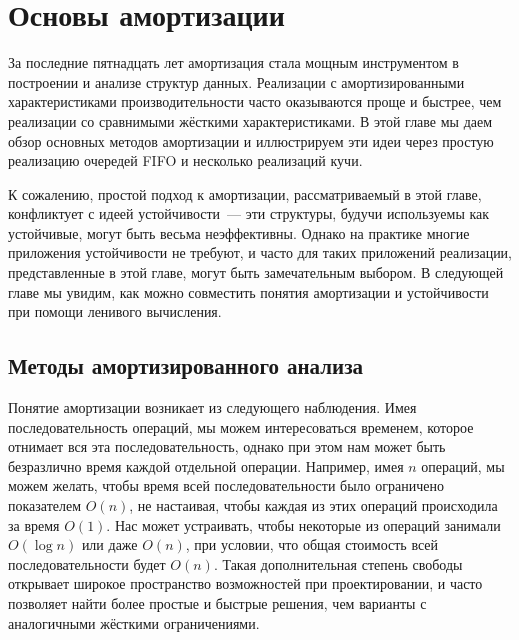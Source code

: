 \chapter{Основы амортизации}
\label{ch:5}

За последние пятнадцать лет амортизация стала мощным инструментом в
построении и анализе структур данных. Реализации с амортизированными
характеристиками производительности часто оказываются проще и быстрее,
чем реализации со сравнимыми жёсткими характеристиками. В этой главе
мы даем обзор основных методов амортизации и иллюстрируем эти идеи
через простую реализацию очередей FIFO и несколько реализаций кучи.

К сожалению, простой подход к амортизации, рассматриваемый в этой
главе, конфликтует с идеей устойчивости~--- эти структуры, будучи
используемы как устойчивые, могут быть весьма неэффективны. Однако на
практике многие приложения устойчивости не требуют, и часто для таких
приложений реализации, представленные в этой главе, могут быть
замечательным выбором. В следующей главе мы увидим, как можно
совместить понятия амортизации и устойчивости при помощи ленивого
вычисления.

\section{Методы амортизированного анализа}
\label{sc:5.1}

Понятие амортизации возникает из следующего наблюдения.  Имея
последовательность операций, мы можем интересоваться временем, которое
отнимает вся эта последовательность, однако при этом нам может быть
безразлично время каждой отдельной операции. Например, имея $n$
операций, мы можем желать, чтобы время всей последовательности было
ограничено показателем $O(n)$, не настаивая, чтобы каждая из этих
операций происходила за время $O(1)$. Нас может устраивать, чтобы
некоторые из операций занимали $O(\log n)$ или даже $O(n)$, при
условии, что общая стоимость всей последовательности будет
$O(n)$. Такая дополнительная степень свободы открывает широкое
пространство возможностей при проектировании, и часто позволяет найти
более простые и быстрые решения, чем варианты с аналогичными жёсткими
ограничениями.

